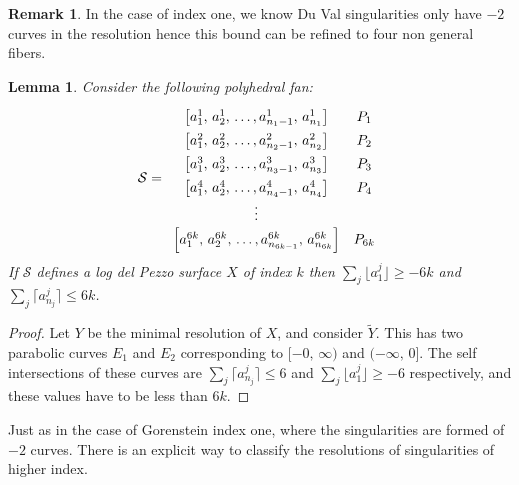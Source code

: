 \documentclass[12pt,a4paper]{book}      %
\newtheorem{lem}[thm]{Lemma}
\theoremstyle{definition}
\newtheorem*{rem}{Remark}
\begin{document}
\begin{rem}
In the case of index one, we know Du Val singularities only have $-2$ curves in the resolution hence this bound can be refined to four non general fibers.
\end{rem}

\begin{lem}{\label{MaxLength}}
Consider the following polyhedral fan:
\[\def\arraystretch{1.4}
\mathcal{S} = 
\begin{array}{cc}
\left[a_1^1, \, a_2^1,\,  \dots, a_{n_1 - 1}^1, \, a_{n_1}^1 \right] & P_1 \\
\left[a_1^2, \, a_2^2,\,  \dots, a_{n_2 - 1}^2, \, a_{n_2}^2 \right] & P_2 \\
\left[a_1^3, \, a_2^3,\,  \dots, a_{n_3 - 1}^3, \, a_{n_3}^3 \right] & P_3 \\
\left[a_1^4, \, a_2^4,\,  \dots, a_{n_4 - 1}^4, \, a_{n_4}^4 \right] & P_4 \\
\vdots \\
\left[ a_1^{6k}, \, a_2^{6k}, \,  \dots, a_{n_{6k-1}}^{6k}, \, a_{n_{6k}}^{6k} \right] & P_{6k} \\
\end{array}
\] 
If $\mathcal{S}$ defines a log del Pezzo surface $X$ of index $k$ then $\sum_j \lfloor a_1^j \rfloor \geq -6k$ and $\sum_j \lceil a_{n_j}^{j} \rceil \leq 6k$.
\end{lem}
\begin{proof}
Let $Y$ be the minimal resolution of $X$, and consider $\widetilde{Y}$. This has two parabolic curves $E_1$ and $E_2$ corresponding to $[-0, \, \infty)$ and $(-\infty, \, 0]$. The self intersections of these curves are $\sum_j \lceil a_{n_j}^{j} \rceil \leq 6$ and $\sum_j \lfloor a_1^j \rfloor \geq -6$ respectively, and these values have to be less than $6k$.
\end{proof}

Just as in the case of Gorenstein index one, where the singularities are formed of $-2$ curves. There is an explicit way to classify the resolutions of singularities of higher index.
\end{document}
